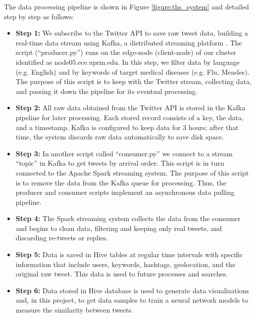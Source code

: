 \documentclass[12pt]{report}
\begin{document}
The data processing pipeline is shown in Figure \ref{figure:ths_system} and detailed step by step as follows:

\begin{itemize}
	\item \textbf{Step 1:} We subscribe to the Twitter \ac{API} to save raw tweet data, building a real-time data stream using Kafka, a distributed streaming platform \cite{Kafka2019}. The script (``producer.py'') runs on the edge-node (client-node) of our cluster identified as node05.ece.uprm.edu. In this step, we filter data by language (e.g. English) and by keywords of target medical diseases (e.g. Flu, Measles). The purpose of this script is to keep with  the Twitter stream, collecting data, and 
	passing it down the pipeline for its eventual processing.
	
	\item \textbf{Step 2:} All raw data obtained from the Twitter \ac{API} is stored in the Kafka pipeline for later processing. Each stored record consists of a key, the data, and a timestamp. Kafka is configured to keep data for 3 hours; after that time, the system discards raw data automatically to save disk space. 
	
	\item \textbf{Step 3:} In another script called ``consumer.py'' we connect to a stream ``topic'' in Kafka to get tweets  by arrival order. This script is in turn  connected to 
	the Apache Spark streaming system. The purpose of this script is to remove the data from the Kafka queue for processing. Thus, the producer and consumer
	scripts implement an asynchronous	data pulling pipeline. 
	
	\item \textbf{Step 4:} The Spark streaming system collects the data from the consumer and begins to clean data, filtering and keeping only real tweets, and discarding re-tweets or replies. %
	
	\item \textbf{Step 5:} Data is saved in Hive tables at regular time intervals with specific information that include users, keywords, hashtags, geolocation, and the original raw tweet. This data is used to future processes and searches.
	
	\item \textbf{Step 6:} Data stored in Hive database is used to generate data visualizations and, in this project, to get data samples to train a  neural network models to measure the similarity between tweets.
	
\end{itemize}
\end{document}

